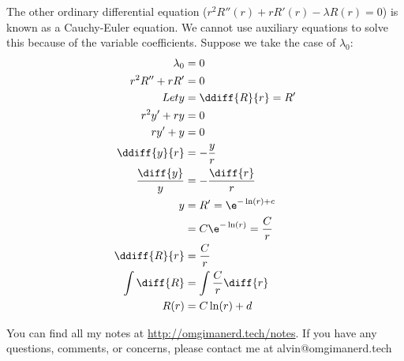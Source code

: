 \documentclass{math}
\begin{document}
The other ordinary differential equation (\( r^2R''(r)+rR'(r)-\lambda R(r) =
0 \)) is known as a Cauchy-Euler equation. We cannot use auxiliary equations to
solve this because of the variable coefficients. Suppose we take the case of
\( \lambda_0 \):
\begin{align*}
  \lambda_0 &= 0 \\
  r^2R''+rR' &= 0 \\
  Let y &= \ddiff{R}{r} = R' \\
  r^2y'+ry &= 0 \\
  ry'+y &= 0 \\
  \ddiff{y}{r} &= -\frac{y}{r} \\
  \frac{\diff{y}}{y} &= -\frac{\diff{r}}{r} \\
  y &= R' = \e^{-\ln(r)+c} \\
  &= C\e^{-\ln(r)} = \frac{C}{r} \\
  \ddiff{R}{r} &= \frac{C}{r} \\
  \int\diff{R} &= \int\frac{C}{r}\diff{r} \\
  R(r) &= C\ln(r)+d
\end{align*}

\begin{center}
  You can find all my notes at \url{http://omgimanerd.tech/notes}. If you have
  any questions, comments, or concerns, please contact me at
  alvin@omgimanerd.tech
\end{center}
\end{document}
